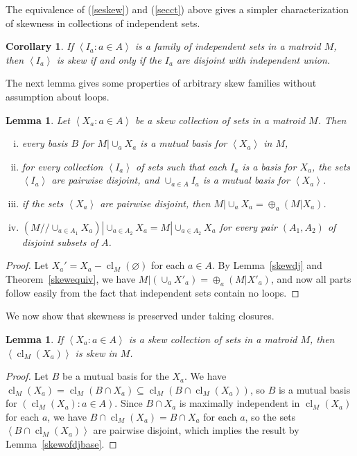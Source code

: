 \documentclass{amsart}
\theoremstyle{plain}
\newtheorem{lemma}[theorem]{Lemma}
\newtheorem{corollary}[theorem]{Corollary}
\theoremstyle{definition}
\newcommand{\dcon}{/ \!\! /}
\DeclareMathOperator{\cl}{cl}
\newcommand{\ab}[1]{\left\langle#1\right\rangle}
\newcommand{\es}{\varnothing}
\renewcommand{\ss}{\subseteq}
\begin{document}
The equivalence of (\ref{seskew}) and (\ref{secct}) above gives a simpler characterization
of skewness in collections of independent sets. 

\begin{corollary}\label{skewindep}
  If $\ab{I_a : a \in A}$ is a family of independent sets in a matroid $M$, 
  then $\ab{I_a}$ is skew if and only if the $I_a$ are disjoint with independent union. 
\end{corollary}

The next lemma gives some properties of arbitrary skew families without assumption about loops. 

\begin{lemma}\label{skewgoodbase}
  Let $\ab{X_a : a \in A}$ be a skew collection of sets in a matroid $M$. Then 
  \begin{enumerate}[(i)]
    \item every basis $B$ for $M | \cup_a X_a$ is a mutual basis for $\ab{X_a}$ in $M$, 
    \item for every collection $\ab{I_a}$ of sets such that each $I_a$ is a basis for $X_a$, 
      the sets $\ab{I_a}$ are pairwise disjoint, and $\cup_{a \in A} I_a$ 
      is a mutual basis for $\ab{X_a}$.
    \item if the sets $\ab{X_a}$ are pairwise disjoint, then $M | \cup_a X_a = \oplus_a (M | X_a)$. 
    \item $(M \dcon \cup_{a \in A_1} X_a) | \cup_{a \in A_2} X_a = M | \cup_{a \in A_2} X_a$ 
      for every pair $(A_1, A_2)$ of disjoint subsets of $A$.
  \end{enumerate}
\end{lemma}
\begin{proof}
  Let $X_a' = X_a - \cl_M(\es)$ for each $a \in A$. 
  By Lemma~\ref{skewdj} and Theorem~\ref{skewequiv}, we have 
  $M | (\cup_a X'_a) = \oplus_{a} (M | X'_a)$, and now all parts follow easily
  from the fact that independent sets contain no loops.
\end{proof}


We now show that skewness is preserved under taking closures. 

\begin{lemma}\label{clskew}
  If $\ab{X_a : a \in A}$ is a skew collection of sets in a matroid $M$, 
  then $\ab{\cl_M(X_a)}$ is skew in $M$. 
\end{lemma}
\begin{proof}
  Let $B$ be a mutual basis for the $X_a$. 
  We have $\cl_M(X_a) = \cl_M(B \cap X_a) \ss \cl_M(B \cap \cl_M(X_a))$, 
  so $B$ is a mutual basis for $(\cl_M(X_a) : a \in A)$. 
  Since $B \cap X_a$ is maximally independent in $\cl_M(X_a)$ for each $a$,
  we have $B \cap \cl_M(X_a) = B \cap X_a$ for each $a$, 
  so the sets $\ab{B \cap \cl_M(X_a)}$ are pairwise disjoint, 
  which implies the result by Lemma~\ref{skewofdjbase}. 
\end{proof}
\end{document}
